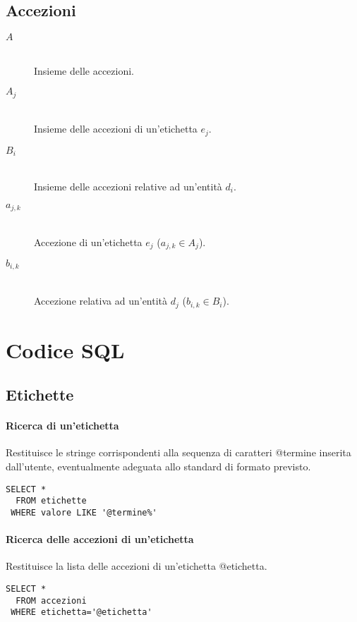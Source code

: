 \subsection*{Accezioni}
\begin{description}
	\item[$A$] \hfill \\
	Insieme delle accezioni.
	\item[$A_j$] \hfill \\
	Insieme delle accezioni di un'etichetta $e_j$.
	\item[$B_i$] \hfill \\
	Insieme delle accezioni relative ad un'entità $d_i$.
	\item[$a_{j,k}$] \hfill \\
	Accezione di un'etichetta $e_j$ ($a_{j,k} \in A_j$).
	\item[$b_{i,k}$] \hfill \\
	Accezione relativa ad un'entità $d_j$ ($b_{i,k} \in B_i$).
\end{description}

\section*{Codice SQL}

\subsection*{Etichette}

\paragraph{Ricerca di un'etichetta}
Restituisce le stringe corrispondenti alla sequenza di caratteri \textsf{@termine} inserita dall'utente, eventualmente adeguata allo standard di formato previsto.

\begin{verbatim}
SELECT *
  FROM etichette	
 WHERE valore LIKE '@termine%'
\end{verbatim}
	
\paragraph{Ricerca delle accezioni di un'etichetta}
Restituisce la lista delle accezioni di un'etichetta \textsf{@etichetta}.
	
\begin{verbatim}
SELECT *
  FROM accezioni	
 WHERE etichetta='@etichetta'
\end{verbatim}


